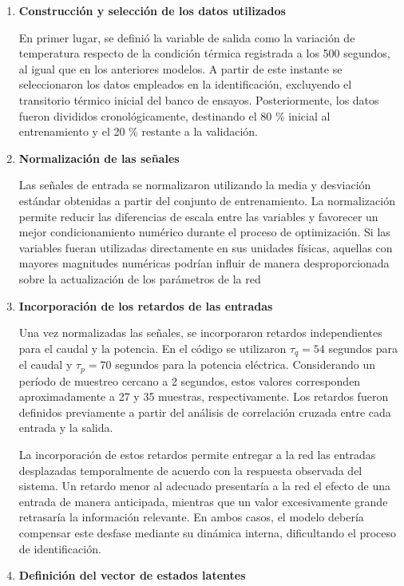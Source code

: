 \documentclass[11pt]{report}
\begin{document}
\begin{enumerate}
    \item \textbf{Construcción y selección de los datos utilizados}

    En primer lugar, se definió la variable de salida como la variación de temperatura respecto de la condición térmica registrada a los 500 segundos, al igual que en los anteriores modelos. A partir de este instante se seleccionaron los datos empleados en la identificación, excluyendo el transitorio térmico inicial del banco de ensayos. Posteriormente, los datos fueron divididos cronológicamente, destinando el 80 \% inicial al entrenamiento y el 20 \% restante a la validación. 

    \item \textbf{Normalización de las señales}

    Las señales de entrada se normalizaron utilizando la media y desviación estándar obtenidas a partir del conjunto de entrenamiento. La normalización permite reducir las diferencias de escala entre las variables y favorecer un mejor condicionamiento numérico durante el proceso de optimización. Si las variables fueran utilizadas directamente en sus unidades físicas, aquellas con mayores magnitudes numéricas podrían influir de manera desproporcionada sobre la actualización de los parámetros de la red

\item \textbf{Incorporación de los retardos de las entradas}


Una vez normalizadas las señales, se incorporaron retardos independientes para el caudal y la potencia. En el código se utilizaron  $\tau_q=54$ segundos para el caudal y $\tau_p=70$ segundos para la potencia eléctrica. Considerando un período de muestreo cercano a 2 segundos, estos valores corresponden aproximadamente a 27 y 35 muestras, respectivamente. Los retardos fueron definidos previamente a partir del análisis de correlación cruzada entre cada entrada y la salida.

La incorporación de estos retardos permite entregar a la red las entradas desplazadas temporalmente de acuerdo con la respuesta observada del sistema. Un retardo menor al adecuado presentaría a la red el efecto de una entrada de manera anticipada, mientras que un valor excesivamente grande retrasaría la información relevante. En ambos casos, el modelo debería compensar este desfase mediante su dinámica interna, dificultando el proceso de identificación.

\item \textbf{Definición del vector de estados latentes}


\end{enumerate}
\end{document}

